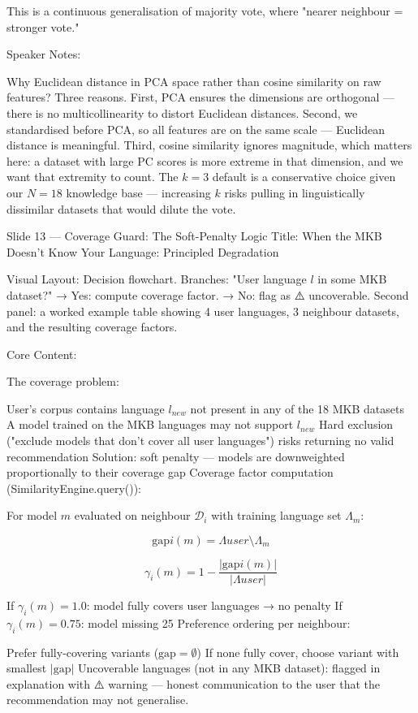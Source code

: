 This is a continuous generalisation of majority vote, where "nearer neighbour = stronger vote."

Speaker Notes:

Why Euclidean distance in PCA space rather than cosine similarity on raw features? Three reasons. First, PCA ensures the dimensions are orthogonal — there is no multicollinearity to distort Euclidean distances. Second, we standardised before PCA, so all features are on the same scale — Euclidean distance is meaningful. Third, cosine similarity ignores magnitude, which matters here: a dataset with large PC scores is more extreme in that dimension, and we want that extremity to count. The $k=3$ default is a conservative choice given our $N=18$ knowledge base — increasing $k$ risks pulling in linguistically dissimilar datasets that would dilute the vote.

Slide 13 — Coverage Guard: The Soft-Penalty Logic
Title: When the MKB Doesn't Know Your Language: Principled Degradation

Visual Layout: Decision flowchart. Branches: "User language $l$ in some MKB dataset?" → Yes: compute coverage factor. → No: flag as ⚠️ uncoverable. Second panel: a worked example table showing 4 user languages, 3 neighbour datasets, and the resulting coverage factors.

Core Content:

The coverage problem:

User's corpus contains language $l_{new}$ not present in any of the 18 MKB datasets
A model trained on the MKB languages may not support $l_{new}$
Hard exclusion ("exclude models that don't cover all user languages") risks returning no valid recommendation
Solution: soft penalty — models are downweighted proportionally to their coverage gap
Coverage factor computation (SimilarityEngine.query()):

For model $m$ evaluated on neighbour $\mathcal{D}_i$ with training language set $\Lambda_m$:

$$\text{gap}i(m) = \Lambda{user} \setminus \Lambda_m$$

$$\gamma_i(m) = 1 - \frac{|\text{gap}i(m)|}{|\Lambda{user}|}$$

If $\gamma_i(m) = 1.0$: model fully covers user languages → no penalty
If $\gamma_i(m) = 0.75$: model missing 25%
Preference ordering per neighbour:

Prefer fully-covering variants ($\text{gap} = \emptyset$)
If none fully cover, choose variant with smallest $|\text{gap}|$
Uncoverable languages (not in any MKB dataset): flagged in explanation with ⚠️ warning — honest communication to the user that the recommendation may not generalise.

